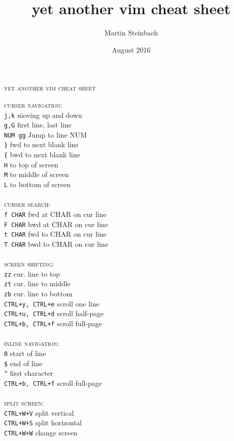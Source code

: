 \documentclass[a4paper,10pt]{scrartcl}
\title{yet another vim cheat sheet}
\author{Martin Steinbach}
\date{August 2016}
\begin{document}
\centering\textsc{\huge{yet another vim cheat sheet}}
\vspace{1cm}


\begin{tabbing}
\large{\textsc{curser navigation:}}\\
\texttt{j,k}		\hspace{2.5 cm}\= moving up and down\\
\texttt{g,G}		\> first line, last line\\
\texttt{NUM gg}		\> Jump to line NUM\\
\texttt{\}}			\> fwd to next blank line\\
\texttt{\{}			\> bwd to next blank line\\
\texttt{H}	\> to top of screen\\
\texttt{M}	\> to middle of screen\\
\texttt{L}	\> to bottom of screen\\\\

\large{\textsc{curser search:}}\\
\texttt{f CHAR} 	\> fwd at CHAR on cur line\\
\texttt{F CHAR} 	\> bwd at CHAR on cur line\\
\texttt{t CHAR} 	\> fwd to CHAR on cur line\\
\texttt{T CHAR} 	\> bwd to CHAR on cur line\\\\

\large{\textsc{screen shifting:}}\\
\texttt{zz}			\> cur. line to top\\
\texttt{zt}			\> cur. line to middle\\
\texttt{zb}			\> cur. line to bottom\\
\texttt{CTRL+y, CTRL+e}		\> scroll one line\\
\texttt{CTRL+u, CTRL+d}		\> scroll half-page\\
\texttt{CTRL+b, CTRL+f}		\> scroll full-page\\\\

\large{\textsc{inline navigation:}}\\
\texttt{0}					\> start of line\\
\texttt{\$}					\> end of line \\
\texttt{\^}					\> first character\\
\texttt{CTRL+b, CTRL+f}		\> scroll full-page\\\\

\large{\textsc{split screen:}}\\
\texttt{CTRL+W+V}	\> split vertical\\
\texttt{CTRL+W+S}	\> split horizontal\\
\texttt{CTRL+W+W}	\> change screen\\
\end{tabbing}
\end{document}
